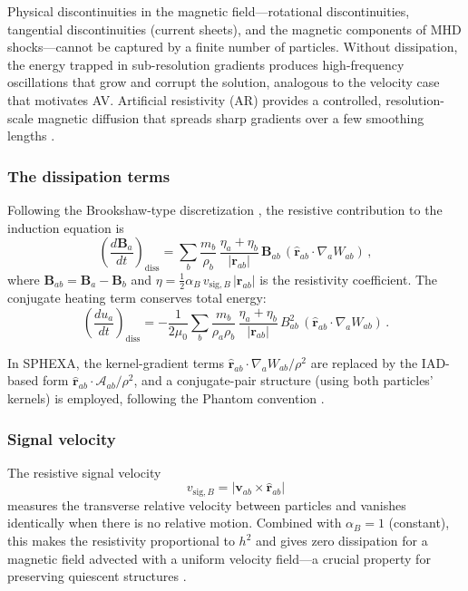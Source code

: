 Physical discontinuities in the magnetic field---rotational discontinuities, tangential discontinuities (current sheets), and the magnetic components of MHD shocks---cannot be captured by a finite number of particles. Without dissipation, the energy trapped in sub-resolution gradients produces high-frequency oscillations that grow and corrupt the solution, analogous to the velocity case that motivates AV. Artificial resistivity (AR) provides a controlled, resolution-scale magnetic diffusion that spreads sharp gradients over a few smoothing lengths \cite{Price2018, Wissing2020}.


\subsubsection*{The dissipation terms}

Following the Brookshaw-type discretization \cite{Wissing2020}, the resistive contribution to the induction equation is
\begin{equation}
    \left(\frac{d\mathbf{B}_a}{dt}\right)_\mathrm{diss} = \sum_b \frac{m_b}{\rho_b}\,\frac{\eta_a + \eta_b}{|\mathbf{r}_{ab}|}\, \mathbf{B}_{ab}\,(\hat{\mathbf{r}}_{ab} \cdot \nabla_a W_{ab})\,,
    \label{eq:ar_dB}
\end{equation}
where $\mathbf{B}_{ab} = \mathbf{B}_a - \mathbf{B}_b$ and $\eta = \tfrac{1}{2}\alpha_B \, v_{\mathrm{sig},B}\, |\mathbf{r}_{ab}|$ is the resistivity coefficient. The conjugate heating term conserves total energy:
\begin{equation}
    \left(\frac{du_a}{dt}\right)_\mathrm{diss} = -\frac{1}{2\mu_0} \sum_b \frac{m_b}{\rho_a \rho_b}\,\frac{\eta_a + \eta_b}{|\mathbf{r}_{ab}|}\, B_{ab}^2\,(\hat{\mathbf{r}}_{ab} \cdot \nabla_a W_{ab})\,.
    \label{eq:ar_du}
\end{equation}

In SPHEXA, the kernel-gradient terms $\hat{\mathbf{r}}_{ab} \cdot \nabla_a W_{ab} / \rho^2$ are replaced by the IAD-based form $\hat{\mathbf{r}}_{ab} \cdot \boldsymbol{\mathcal{A}}_{ab} / \rho^2$, and a conjugate-pair structure (using both particles' kernels) is employed, following the Phantom convention \cite{Price2018}.


\subsubsection*{Signal velocity}

The resistive signal velocity
\begin{equation}
    v_{\mathrm{sig},B} = |\mathbf{v}_{ab} \times \hat{\mathbf{r}}_{ab}|
    \label{eq:vsigB}
\end{equation}
measures the transverse relative velocity between particles and vanishes identically when there is no relative motion. Combined with $\alpha_B = 1$ (constant), this makes the resistivity proportional to $h^2$ and gives zero dissipation for a magnetic field advected with a uniform velocity field---a crucial property for preserving quiescent structures \cite{Price2018}.


